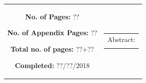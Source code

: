 {\begin{tabular}{cc}
{	\begin{description}
		\item { \textbf{No. of Pages: } ?? } 
		\item { \textbf{No. of Appendix Pages: } ?? }
		\item { \textbf{Total no. of pages: } ??+?? } 
		\item { \textbf{Completed:} ??/??/2018}
	\end{description}
	\vfill } &
	\parbox{6.5cm}{
 	 \vspace{.15cm}
  	\hfill 
  	\begin{tabular}{l}
  		{ Abstract:}\bigskip \\
  		\fbox{
  		\parbox{7cm}{\bigskip
     		{\vfill{\small 
     		\bigskip}}
     	}}
   	\end{tabular}}
\end{tabular}
}